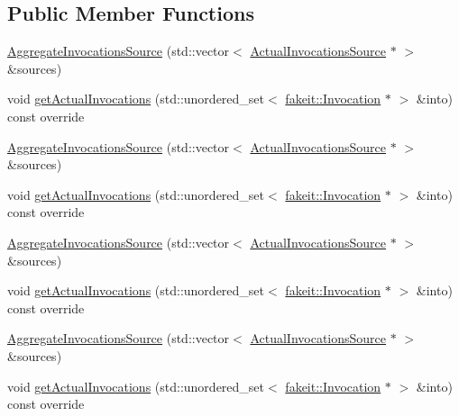 \subsection*{Public Member Functions}
\begin{DoxyCompactItemize}
\item 
\mbox{\hyperlink{structfakeit_1_1AggregateInvocationsSource_a78f9370e3a080514683a15368399dd0f}{Aggregate\+Invocations\+Source}} (std\+::vector$<$ \mbox{\hyperlink{structfakeit_1_1ActualInvocationsSource}{Actual\+Invocations\+Source}} $\ast$ $>$ \&sources)
\item 
void \mbox{\hyperlink{structfakeit_1_1AggregateInvocationsSource_a46d5ec34c9428d33be90ba03fecc1f44}{get\+Actual\+Invocations}} (std\+::unordered\+\_\+set$<$ \mbox{\hyperlink{structfakeit_1_1Invocation}{fakeit\+::\+Invocation}} $\ast$ $>$ \&into) const override
\item 
\mbox{\hyperlink{structfakeit_1_1AggregateInvocationsSource_a78f9370e3a080514683a15368399dd0f}{Aggregate\+Invocations\+Source}} (std\+::vector$<$ \mbox{\hyperlink{structfakeit_1_1ActualInvocationsSource}{Actual\+Invocations\+Source}} $\ast$ $>$ \&sources)
\item 
void \mbox{\hyperlink{structfakeit_1_1AggregateInvocationsSource_a46d5ec34c9428d33be90ba03fecc1f44}{get\+Actual\+Invocations}} (std\+::unordered\+\_\+set$<$ \mbox{\hyperlink{structfakeit_1_1Invocation}{fakeit\+::\+Invocation}} $\ast$ $>$ \&into) const override
\item 
\mbox{\hyperlink{structfakeit_1_1AggregateInvocationsSource_a78f9370e3a080514683a15368399dd0f}{Aggregate\+Invocations\+Source}} (std\+::vector$<$ \mbox{\hyperlink{structfakeit_1_1ActualInvocationsSource}{Actual\+Invocations\+Source}} $\ast$ $>$ \&sources)
\item 
void \mbox{\hyperlink{structfakeit_1_1AggregateInvocationsSource_a46d5ec34c9428d33be90ba03fecc1f44}{get\+Actual\+Invocations}} (std\+::unordered\+\_\+set$<$ \mbox{\hyperlink{structfakeit_1_1Invocation}{fakeit\+::\+Invocation}} $\ast$ $>$ \&into) const override
\item 
\mbox{\hyperlink{structfakeit_1_1AggregateInvocationsSource_a78f9370e3a080514683a15368399dd0f}{Aggregate\+Invocations\+Source}} (std\+::vector$<$ \mbox{\hyperlink{structfakeit_1_1ActualInvocationsSource}{Actual\+Invocations\+Source}} $\ast$ $>$ \&sources)
\item 
void \mbox{\hyperlink{structfakeit_1_1AggregateInvocationsSource_a46d5ec34c9428d33be90ba03fecc1f44}{get\+Actual\+Invocations}} (std\+::unordered\+\_\+set$<$ \mbox{\hyperlink{structfakeit_1_1Invocation}{fakeit\+::\+Invocation}} $\ast$ $>$ \&into) const override

\end{DoxyCompactItemize}
